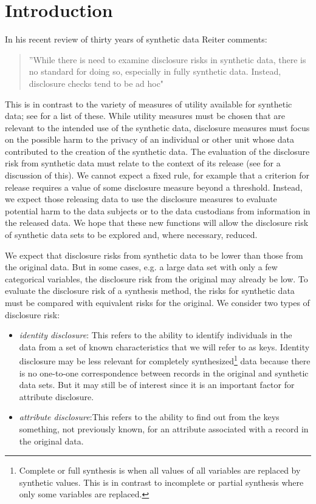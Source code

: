 \documentclass[12pt]{article}
\renewcommand{\baselinestretch}{1.5} %
\begin{document}
\section{Introduction}
\renewcommand{\baselinestretch}{1.5} 
In his recent review of thirty years of synthetic data Reiter \cite{reiter2023}
comments: 
\begin{quote}
''While there is need to examine disclosure risks in synthetic data, there is no standard for
doing so, especially in fully synthetic data. Instead, disclosure checks tend to be ad hoc"
\end{quote}
This is in contrast to the variety of measures of utility available for synthetic data; see \cite{raab2021} for a list of these. While utility measures must be chosen that are relevant to the intended use of the synthetic data, disclosure measures must focus on the possible harm to the privacy of an individual or other unit whose data contributed to the creation of the synthetic data. The evaluation of the disclosure risk from synthetic data must relate to the context of its release (see \cite{elliot_anonframe} for a discussion of this). We cannot expect a fixed rule, for example that a criterion for release requires a value of some disclosure measure beyond a threshold. Instead, we expect those releasing data to use the disclosure measures to evaluate potential harm to the data subjects or to the data custodians from information in the released data. We hope that these new functions will allow the disclosure risk of synthetic data sets to be explored and, where necessary, reduced. 

We expect that disclosure risks from synthetic data to be lower than those from the original data. But in some cases, e.g. a large data set with only a few categorical variables, the disclosure risk from the original may already be low. To evaluate the disclosure risk of a synthesis method, the risks for synthetic data must be compared with equivalent risks for the original. We consider two types of disclosure risk:

\begin{itemize}
\item{\textit{identity disclosure}: This refers to the ability to identify individuals in the data from a set of known characteristics that we will refer to as keys. Identity disclosure may be less relevant for completely synthesized\footnote{Complete or full synthesis is when all values of all variables are replaced by synthetic values. This is in contrast to incomplete or partial synthesis where only some variables are replaced.} data because there is no one-to-one correspondence between records in the original and synthetic data sets. But it may still be of interest since it is an important factor for attribute disclosure.}
\item{\textit{attribute disclosure}:This refers to the ability to find out from the keys something, not previously known, for an attribute associated with a record in the original data.}
\end{itemize}
\end{document}
